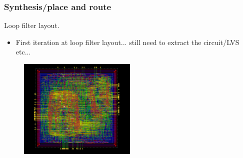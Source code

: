 \documentclass[t, screen, aspectratio=43]{beamer}
\begin{document}
\begin{frame}
	\frametitle{Synthesis/place and route}
	\begin{block}{Loop filter layout.}
	\tiny
	\begin{itemize}[itemsep=4pt,label=\protect---]
		\item First iteration at loop filter layout... still need to extract the circuit/LVS etc...
	\end{itemize}
	\vspace{-1em}
	\begin{figure}[htb!]
	        \centering
	        \includegraphics[width=0.5\textwidth, angle=0]{lf_layout}
	\end{figure}

	\end{block}	
\end{frame}







\end{document}
